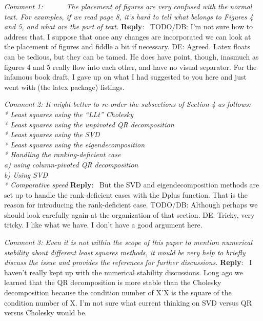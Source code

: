 \documentclass[10pt]{article}
\newcommand{\pointRaised}[2]{\smallskip %
  \textsl{{\fontseries{b}\selectfont #1}: #2}\newline}
\newcommand{\reply}[1]{\textbf{Reply}:\ #1 \smallskip } %
\begin{document}
\pointRaised{Comment 1}{     
  The placement of figures are very confused with the normal text. 
  For examples, if we read page 8, it's hard to tell what belongs to 
  Figures 4 and 5, and what are the part of text. 
}
\reply{
  TODO/DB: I'm not sure how to address that.  I suppose that once any
  changes are incorporated we can look at the placement of figures
  and fiddle a bit if necessary.
  \newline
  DE: Agreed.  Latex floats can be tedious, but they can be tamed.  He does
  have point, though, inasmuch as figures 4 and 5 really flow into each
  other, and have no visual separator. For the infamous book draft, I gave up
  on what I had suggested to you here and just went with (the latex package)
  listings.   
}


\pointRaised{Comment 2}{
  It might better to re-order the subsections of Section 4 as follows: \\
  * Least squares using the ``LLt'' Cholesky \\
  * Least squares using the unpivoted QR decomposition\\
  * Least squares using the SVD \\
  * Least squares using the eigendecomposition \\
  * Handling the ranking-deficient case \\
    a) using column-pivoted QR decomposition \\
    b) Using SVD \\
  * Comparative speed 
}
\reply{
  But the SVD and eigendecomposition methods are set up to handle
  the rank-deficient cases with the Dplus function.  That is the
  reason for introducing the rank-deficient case. 
  TODO/DB: Although perhaps
  we should look carefully again at the organization of that section.
  DE: Tricky, very tricky.  I like what we have. I don't have a good argument
  here.
}

\pointRaised{Comment 3}{
  Even it is not within the scope of this paper to mention
  numerical stability about different least squares methods, 
  it would be very help to briefly discuss the issue and provides
  the references for further discussions. 
}
\reply{
  I haven't really kept up with the numerical stability
  discussions.  Long ago we learned that the QR decomposition is
  more stable than the Cholesky decomposition because the condition
  number of X'X is the square of the condition number of X.  I'm
  not sure what current thinking on SVD versus QR versus Cholesky
  would be.
}
\end{document}
